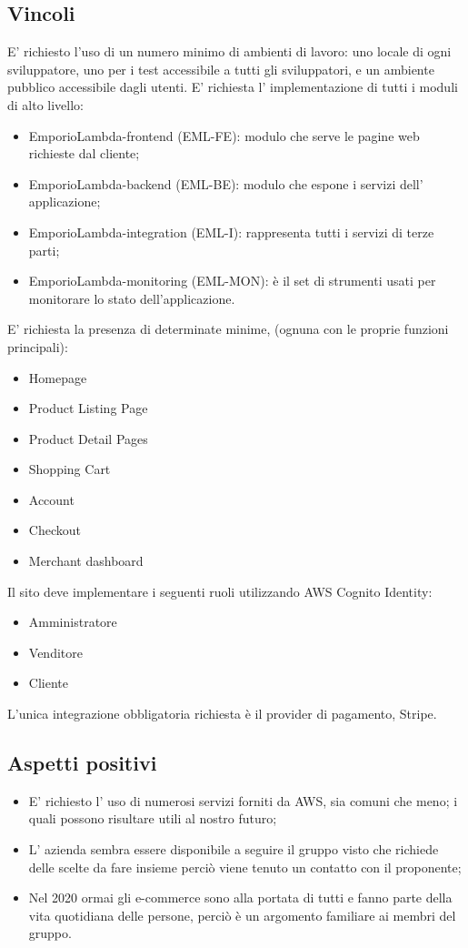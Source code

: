 \subsection{Vincoli}
E' richiesto l'uso di un numero minimo di ambienti di lavoro: uno locale di ogni sviluppatore, uno per i test accessibile a tutti gli sviluppatori, e un ambiente pubblico accessibile dagli utenti.
E' richiesta l' implementazione di tutti i moduli di alto livello:
\begin{itemize}
\item	EmporioLambda-frontend (EML-FE): modulo che serve le pagine web richieste dal cliente;
\item	EmporioLambda-backend (EML-BE): modulo che espone i servizi dell' applicazione;
\item	EmporioLambda-integration (EML-I): rappresenta tutti i servizi di terze parti;
\item	 EmporioLambda-monitoring (EML-MON): è il set di strumenti usati per monitorare lo stato dell'applicazione.
\end{itemize}
E' richiesta la presenza di determinate minime, (ognuna con le proprie funzioni principali):
\begin{itemize}
\item	Homepage
\item	Product Listing Page
\item	Product Detail Pages
\item	Shopping Cart
\item	Account
\item	Checkout
\item	Merchant dashboard
\end{itemize}
Il sito deve implementare i seguenti ruoli utilizzando AWS Cognito Identity:
\begin{itemize}
\item	Amministratore
\item	Venditore
\item	Cliente
\end{itemize}
L'unica integrazione obbligatoria richiesta è il provider di pagamento, Stripe.
\subsection{Aspetti positivi}
\begin{itemize}
\item	E' richiesto l' uso di numerosi servizi forniti da AWS, sia comuni che meno; i quali possono risultare utili al nostro futuro;
\item	L' azienda sembra essere disponibile a seguire il gruppo visto che richiede delle scelte da fare insieme perciò viene tenuto un contatto con il proponente;
\item	Nel 2020 ormai gli e-commerce sono alla portata di tutti e fanno parte della vita quotidiana delle persone, perciò è un argomento familiare ai membri del gruppo.
\end{itemize}
